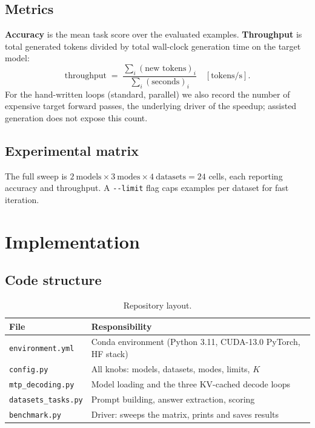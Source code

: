 \documentclass[11pt]{article}
\begin{document}
\subsection{Metrics}
\textbf{Accuracy} is the mean task score over the evaluated examples.
\textbf{Throughput} is total generated tokens divided by total wall-clock
generation time on the target model:
\begin{equation}
\text{throughput} \;=\; \frac{\sum_i (\text{new tokens})_i}{\sum_i (\text{seconds})_i}
\quad [\text{tokens/s}].
\end{equation}
For the hand-written loops (standard, parallel) we also record the number of
expensive target forward passes, the underlying driver of the speedup; assisted
generation does not expose this count.

\subsection{Experimental matrix}
The full sweep is $2\ \text{models} \times 3\ \text{modes} \times 4\
\text{datasets} = 24$ cells, each reporting accuracy and throughput. A
\texttt{-{}-limit} flag caps examples per dataset for fast iteration.

\section{Implementation}
\subsection{Code structure}
\begin{table}[h]
\centering
\caption{Repository layout.}
\begin{tabular}{@{}ll@{}}
\toprule
\textbf{File} & \textbf{Responsibility} \\
\midrule
\texttt{environment.yml} & Conda environment (Python 3.11, CUDA-13.0 PyTorch, HF stack) \\
\texttt{config.py}       & All knobs: models, datasets, modes, limits, $K$ \\
\texttt{mtp\_decoding.py} & Model loading and the three KV-cached decode loops \\
\texttt{datasets\_tasks.py} & Prompt building, answer extraction, scoring \\
\texttt{benchmark.py}    & Driver: sweeps the matrix, prints and saves results \\
\bottomrule
\end{tabular}
\end{table}
\end{document}
